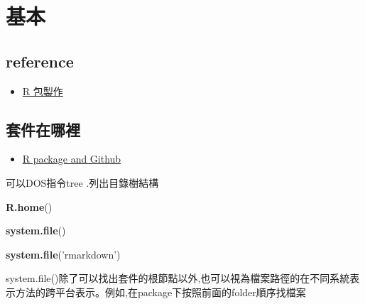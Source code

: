 \documentclass[]{book}
\newenvironment{Shaded}{\begin{snugshade}}{\end{snugshade}}
\newcommand{\KeywordTok}[1]{\textcolor[rgb]{0.13,0.29,0.53}{\textbf{#1}}}
\newcommand{\NormalTok}[1]{#1}
\newcommand{\StringTok}[1]{\textcolor[rgb]{0.31,0.60,0.02}{#1}}
\providecommand{\tightlist}{%
  \setlength{\itemsep}{0pt}\setlength{\parskip}{0pt}}
\theoremstyle{definition}
\theoremstyle{definition}
\theoremstyle{definition}
\theoremstyle{remark}
\begin{document}
\section{基本}

\hypertarget{reference}{%
\subsection{reference}\label{reference}}

\begin{itemize}
\tightlist
\item
  \href{https://yulongniu.bionutshell.org/blog/2012/05/30/r-package-and-roxygen2/}{R
  包製作}
\end{itemize}

\subsection{套件在哪裡}

\begin{itemize}
\tightlist
\item
  \href{http://r-pkgs.had.co.nz/git.html}{R package and Github}
\end{itemize}

可以DOS指令tree .列出目錄樹結構

\begin{Shaded}
\begin{Highlighting}[]
\KeywordTok{R.home}\NormalTok{()}
\end{Highlighting}
\end{Shaded}

\begin{Shaded}
\begin{Highlighting}[]
\KeywordTok{system.file}\NormalTok{()}
\end{Highlighting}
\end{Shaded}

\begin{Shaded}
\begin{Highlighting}[]
\KeywordTok{system.file}\NormalTok{(}\StringTok{'rmarkdown'}\NormalTok{)}
\end{Highlighting}
\end{Shaded}

system.file()除了可以找出套件的根節點以外,也可以視為檔案路徑的在不同系統表示方法的跨平台表示。例如,在package下按照前面的folder順序找檔案
\end{document}
